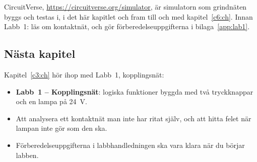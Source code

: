 CircuitVerse, \url{https://circuitverse.org/simulator}, är simulatorn som grindnäten byggs och
testas i, i det här kapitlet och fram till och med kapitel~\ref{c6:ch}. Innan Labb~1: läs
 om kontaktnät, och gör förberedelseuppgifterna i bilaga~\ref{app:lab1}.

\subsection*{Nästa kapitel}
Kapitel~\ref{c3:ch} hör ihop med Labb~1, kopplingsnät:
\begin{itemize}
  \item \textbf{Labb~1 -- Kopplingsnät}: logiska funktioner byggda med två tryckknappar och en lampa
    på 24~V.
  \item Att analysera ett kontaktnät man inte har ritat själv, och att hitta felet när lampan inte
    gör som den ska.
  \item Förberedelseuppgifterna i labbhandledningen ska vara klara när du börjar labben.
\end{itemize}
